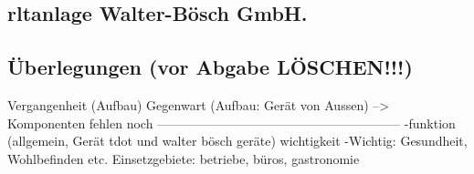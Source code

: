 \subsection{\ac{rltanlage} Walter-Bösch GmbH.}




\subsection{Überlegungen (vor Abgabe LÖSCHEN!!!)} 

Vergangenheit (Aufbau)
Gegenwart (Aufbau: Gerät von Aussen) --> Komponenten fehlen noch
---------------------------------------------------------
-funktion (allgemein, Gerät tdot und walter bösch geräte)
wichtigkeit 
-Wichtig: Gesundheit, Wohlbefinden etc.
Einsetzgebiete: betriebe, büros, gastronomie

